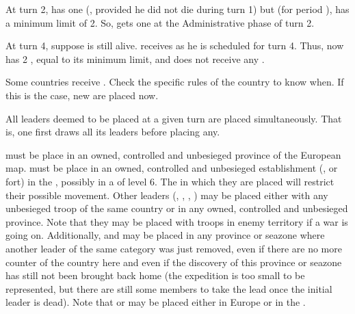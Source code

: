 \begin{exemple}
  At turn 2, \RUS has one \LeaderG (, provided he did
  not die during turn 1) but (for period ), \RUS has a minimum limit
  of 2\LeaderG. So, \RUS gets one \anonyme\LeaderG at the Administrative phase
  of turn 2.

  \smallskip

  At turn 4, suppose \leaderShchenya is still alive. \RUS receives
   as he is scheduled for turn 4. Thus, \RUS now
  has 2 \LeaderG, equal to its minimum limit, and does not receive any
  \anonyme\LeaderG.
\end{exemple}

\aparag[Missionaries] Some countries receive \LeaderMis. Check the specific
rules of the country to know when.
\bparag If this is the case, new \LeaderMis are placed now.

\aparag[Placement] All leaders deemed to be placed at a given turn are placed
simultaneously. That is, one first draws all its \anonyme leaders before
placing any.

\bparag \LeaderMis must be place in an owned, controlled and unbesieged
province of the European map.
\bparag \LeaderGov must be place in an owned, controlled and unbesieged
establishment (\COL, \TP or fort) in the \ROTW, possibly in a \COL of level
6. The \Area in which they are placed will restrict their possible movement.
\bparag Other leaders (\LeaderG, \LeaderA, \LeaderE, \LeaderC) may be placed
either with any unbesieged troop of the same country or in any owned,
controlled and unbesieged province. Note that they may be placed with troops
in enemy territory if a war is going on.
\bparag Additionally, \LeaderE and \LeaderC may be placed in any province or
seazone where another leader of the same category was just removed, even if
there are no more counter of the country here and even if the discovery of
this province or seazone has still not been brought back home (the expedition
is too small to be represented, but there are still some members to take the
lead once the initial leader is dead).
\bparag Note that \LeaderE or \LeaderC may be placed either in Europe or in
the \ROTW.

